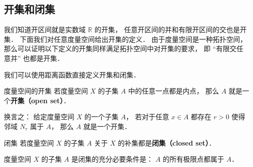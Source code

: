 \subsection{开集和闭集}
我们知道开区间就是实数域 $\mathbb R$ 的开集， 任意开区间的并和有限开区间的交也是开集． 下面我们对任意度量空间给出开集的定义． 由于度量空间是一种拓扑空间， 那么可以证明以下定义的开集同样满足拓扑空间中对开集的要求， 即 “有限交任意并” 也都是开集．





我们可以使用距离函数直接定义开集和闭集．
\begin{definition}{度量空间的开集}
若度量空间 $X$ 的子集 $A$ 中的任意一点都是内点， 那么 $A$ 就是一个\textbf{开集（open set）}．

换言之： 给定度量空间 $X$ 的一个子集 $A$， 若对于任意 $x \in A$ 都存在 $r > 0$ 使得邻域 $N_r$ 属于 $A$， 那么 $A$ 就是一个开集．
\end{definition}

\begin{definition}{闭集}
若度量空间 $X$ 的子集 $A$ 关于 $X$ 的补集都是\textbf{闭集（closed set）}．
\end{definition}

\begin{theorem}{}
度量空间 $X$ 的子集 $A$ 是闭集的充分必要条件是： $A$ 的所有极限点都属于 $A$．
\end{theorem}
